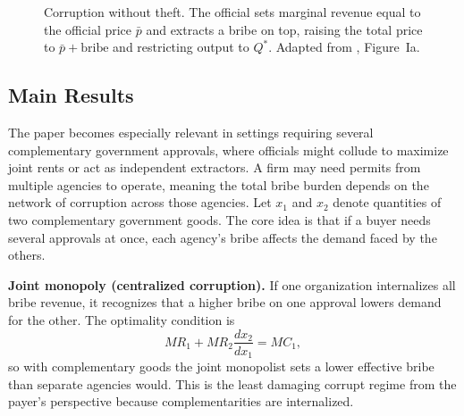 \documentclass[11pt,letterpaper]{article}
\begin{document}
\begin{figure}[t]
\centering
{}
\caption{Corruption without theft. The official sets marginal revenue equal to the official price $\bar{p}$ and extracts a bribe on top, raising the total price to $\bar{p} + \text{bribe}$ and restricting output to $Q^*$. Adapted from \citet{shleifer1993}, Figure~Ia.}
\label{fig:corruption}
\end{figure}

\subsection{Main Results}

The paper becomes especially relevant in settings requiring several complementary government approvals, where officials might collude to maximize joint rents or act as independent extractors. A firm may need permits from multiple agencies to operate, meaning the total bribe burden depends on the network of corruption across those agencies. Let $x_1$ and $x_2$ denote quantities of two complementary government goods. The core idea is that if a buyer needs several approvals at once, each agency's bribe affects the demand faced by the others.

\medskip
\noindent \textbf{Joint monopoly (centralized corruption).} If one organization internalizes all bribe revenue, it recognizes that a higher bribe on one approval lowers demand for the other. The optimality condition is
\begin{equation}
    MR_1 + MR_2 \frac{dx_2}{dx_1} = MC_1,
    \label{eq:joint-monopoly}
\end{equation}
so with complementary goods the joint monopolist sets a lower effective bribe than separate agencies would. This is the least damaging corrupt regime from the payer's perspective because complementarities are internalized.
\end{document}
